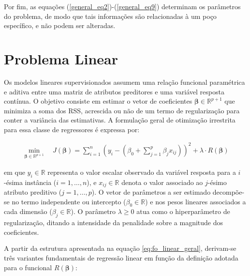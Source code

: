 Por fim, as equações (\ref{general_eq2})-(\ref{general_eq9}) determinam os parâmetros do problema, de modo que tais informações são relacionadas à um poço específico, e não podem ser alteradas.

\section{Problema Linear}

Os modelos lineares supervisionados assumem uma relação funcional paramétrica e aditiva entre uma matriz de atributos preditores e uma variável resposta contínua. O objetivo consiste em estimar o vetor de coeficientes $\boldsymbol{\beta} \in \mathbb{R}^{p+1}$ que minimiza a soma dos \gls{RSS}, acrescida ou não de um termo de regularização para conter a variância das estimativas. A formulação geral de otimização irrestrita para essa classe de regressores é expressa por:

\begin{align}
\min_{\boldsymbol{\beta} \in \mathbb{R}^{p+1}} \quad J(\boldsymbol{\beta}) = \sum_{i=1}^{n} \left(y_i - \left(\beta_0 + \sum_{j=1}^{p} \beta_j x_{ij}\right)\right)^2 + \lambda \cdot R(\boldsymbol{\beta}) \label{eq:fo_linear_geral}
\end{align}

\noindent em que $y_i \in \mathbb{R}$ representa o valor escalar observado da variável resposta para a $i$-ésima instância ($i = 1, \dots, n$), e $x_{ij} \in \mathbb{R}$ denota o valor associado ao $j$-ésimo atributo preditivo ($j = 1, \dots, p$). O vetor de parâmetros a ser estimado decompõe-se no termo independente ou intercepto ($\beta_0 \in \mathbb{R}$) e nos pesos lineares associados a cada dimensão ($\beta_j \in \mathbb{R}$). O parâmetro $\lambda \ge 0$ atua como o hiperparâmetro de regularização, ditando a intensidade da penalidade sobre a magnitude dos coeficientes.

A partir da estrutura apresentada na equação \ref{eq:fo_linear_geral}, derivam-se três variantes fundamentais de regressão linear em função da definição adotada para o funcional $R(\boldsymbol{\beta})$:

